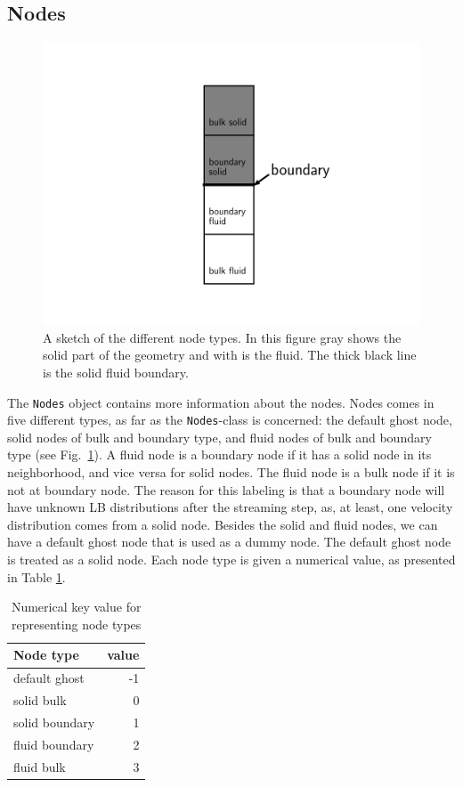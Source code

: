 \documentclass[11pt,a4paper]{report}
\begin{document}
\subsection{Nodes}
\label{sec:nodes}
\begin{figure}
	\centering
	\includegraphics[width=0.7\linewidth]{Figures/nodetypes.pdf}
	\caption{A sketch of the different node types. In this figure gray shows the solid part of the geometry and with is the fluid. The thick black line is the solid fluid boundary.}
	\label{fig:nodetypes}
\end{figure}
The \texttt{Nodes} object contains more information about the nodes. Nodes comes in five different types, as far as the \texttt{Nodes}-class is concerned: the default ghost node, solid nodes of bulk and boundary type, and fluid nodes of bulk and boundary type (see Fig.~\ref{fig:nodetypes}). A fluid node is a boundary node if it has a solid node in its neighborhood, and vice versa for solid nodes. The fluid node is a bulk node if it is not at boundary node. The reason for this labeling is that a boundary node will have unknown LB distributions after the streaming step, as, at least, one velocity distribution comes from a solid node. Besides the solid and fluid nodes, we can have a default ghost node that is used as a dummy node. The default ghost node is treated as a solid node. Each node type is given a numerical value, as presented in Table \ref{tab:node type value}.
\begin{table}
	\centering
	\begin{tabular}{|l|r|}\hline
		{\bf Node type} & {\bf value} \\ \hline
		default ghost & -1 \\ \hline
		solid bulk & 0 \\ \hline
		solid boundary & 1 \\ \hline
		fluid boundary & 2 \\ \hline
		fluid bulk & 3 \\ \hline
	\end{tabular}
	\caption{Numerical key value for representing node types}
	\label{tab:node type value}
\end{table}
\end{document}

